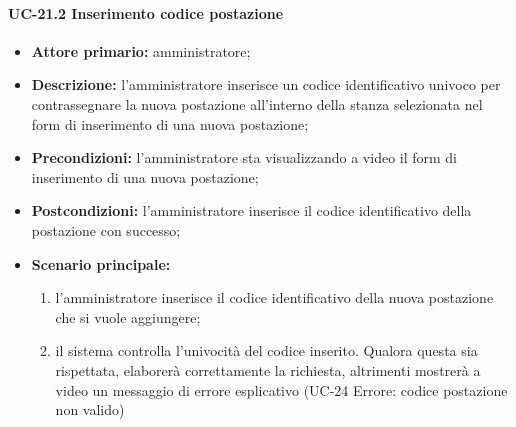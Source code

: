 \paragraph{UC-21.2 Inserimento codice postazione}
\begin{itemize}
	\item \textbf{Attore primario:} amministratore;
	\item \textbf{Descrizione:} l'amministratore inserisce un codice identificativo univoco per contrassegnare la nuova postazione all'interno della stanza selezionata nel form di inserimento di una nuova postazione;
	\item \textbf{Precondizioni:} l'amministratore sta visualizzando a video il form di inserimento di una nuova postazione;
	\item \textbf{Postcondizioni:} l'amministratore inserisce il codice identificativo della postazione con successo;
	\item \textbf{Scenario principale:}
	      \begin{enumerate}
		      \item l'amministratore inserisce il codice identificativo della nuova postazione che si vuole aggiungere;
		      \item il sistema controlla l'univocità del codice inserito. Qualora questa sia rispettata, elaborerà correttamente la richiesta, altrimenti mostrerà a video un messaggio di errore esplicativo (UC-24 Errore: codice postazione non valido)
	      \end{enumerate}
\end{itemize}
    

